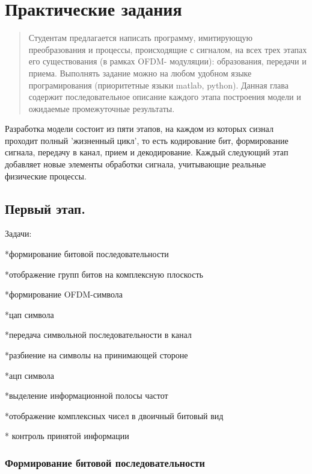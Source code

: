 \documentclass[a4paper,12pt]{article}
\begin{document}
\section{Практические задания}
\begin{abstract}
     Студентам предлагается написать программу, имитирующую преобразования и процессы, происходящие с сигналом, на всех трех этапах его существования (в рамках OFDM- модуляции): образования, передачи и приема.
     Выполнять задание можно на любом удобном языке програмирования (приоритетные языки matlab, python). 
     Данная глава содержит последовательное описание каждого этапа построения модели и ожидаемые промежуточные результаты.
    
\end{abstract}

Разработка модели состоит из пяти этапов, на каждом из которых сизнал проходит полный 'жизненный цикл', то есть кодирование бит, формирование сигнала, передачу в канал, прием и декодирование.  
Каждый следующий этап добавляет новые элементы обработки сигнала, учитывающие реальные физические процессы. 

\subsection{Первый этап.}
Задачи: 

*формирование битовой последовательности

*отображение групп битов на комплексную плоскость

*формирование OFDM-символа

*цап символа

*передача символьной последовательности в канал

*разбиение на символы на принимающей стороне

*ацп символа

*выделение информационной полосы частот

*отображение комплексных чисел в двоичный битовый вид

* контроль принятой информации



\subsubsection{Формирование битовой последовательности}
\end{document}
